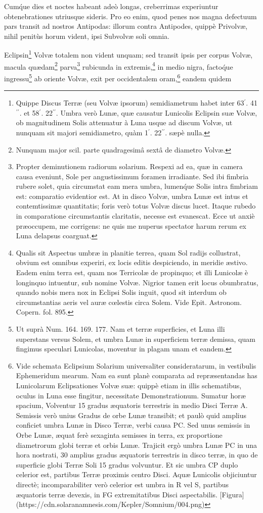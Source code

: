 \documentclass[a4paper, 11pt, oneside, polutonikogreek, german]{article}
\begin{document}
Cum\'que dies et noctes habeant adeò longas, creberrimas experiuntur obtenebrationes utriusque sideris. Pro eo enim, quod penes nos magna defectuum pars transit ad nostros Antipodas: illorum contra Antipodes, quippè Privolvæ, nihil penitùs horum vident, ipsi Subvolvæ soli omnia.

Eclipsin\footnote{Quippe Discus Terræ (seu Volvæ ipsorum) semidiametrum habet inter 63$^{\prime}$. 41$^{\prime\prime}$. et 58$^{\prime}$. 22$^{\prime\prime}$. Umbra verò Lunæ, quæ causatur Lunicolis Eclipsin suæ Volvæ, ob magnitudinem Solis attenuatur à Luna usque ad discum Volvæ, ut nunquam sit majori semidiametro, quàm 1$^{\prime}$. 22$^{\prime\prime}$. sæpè nulla.} Volvæ totalem non vident unquam; sed transit ipsis per corpus Volvæ, macula quædam\footnote{Nunquam major scil. parte quadragesimâ sextâ de diametro Volvæ.} parva\footnote{Propter deminutionem radiorum solarium. Respexi ad ea, quæ in camera causa eveniunt, Sole per angustissimum foramen irradiante. Sed ibi fimbria rubere solet, quia circumstat eam mera umbra, lumen\'que Solis intra fimbriam est: comparatio evidentior est. At in disco Volvæ, umbra Lunæ est intus et contemtissimæ quantitatis; foris verò totus Volvæ discus lucet. Itaque rubedo in comparatione circumstantis claritatis, necesse est evanescat. Ecce ut anxiè præoccupem, me corrigens: ne quis me nuperus spectator harum rerum ex Luna delapsus coarguat.} rubicunda in extremis,\footnote{Qualis sit Aspectus umbræ in planitie terrea, quam Sol radijs collustrat, obvium est omnibus experiri, ex locis editis despiciendo, in meridie æstivo. Eadem enim terra est, quam nos Terricolæ de propinquo; et illi Lunicolæ è longinquo intuentur, sub nomine Volvæ. Nigrior tamen erit locus obumbratus, quando nobis mera nox in Eclipsi Solis inguit, quod sit interdum ob circumstantias aeris vel auræ cœlestis circa Solem. Vide Epit. Astronom. Copern. fol. 895.} in medio nigra, facto\'que ingressu\footnote{Ut suprà Num. 164. 169. 177. Nam et terræ superficies, et Luna illi superstans versus Solem, et umbra Lunæ in superficiem terræ demissa, quam fingimus speculari Lunicolas, moventur in plagam unam et eandem.} ab oriente Volvæ, exit per occidentalem oram,\footnote{Vide schemata Eclipsium Solarium universaliter consideratarum, in vestibulis Ephemeridum mearum. Nam ea sunt planè comparata ad repræsentandas has Lunicolarum Eclipsationes Volvæ suæ: quippè etiam in illis schematibus, oculus in Luna esse fingitur, necessitate Demonstrationum. Sumatur horæ spacium, Volventur 15 gradus æquatoris terrestris in medio Disci Terræ A. Semissis verò unius Gradus de orbe Lunæ transibit; et paulò quid amplius conficiet umbra Lunæ in Disco Terræ, verbi causa PC. Sed unus semissis in Orbe Lunæ, æquat ferè sexaginta semisses in terra, ex proportione diametrorum globi terræ et orbis Lunæ. Trajicit ergò umbra Lunæ PC in una hora nostrati, 30 amplius gradus æquatoris terrestris in disco terræ, in quo de superficie globi Terræ Soli 15 gradus volvuntur. Et sic umbra CP duplo celerior est, partibus Terræ proximis centro Disci. Aquæ Lunicolis objiciuntur directè; incomparabiliter verò celerior est umbra in R vel S, partibus æquatoris terræ devexis, in FG extremitatibus Disci aspectabilis. [Figura](https://cdn.solaranamnesis.com/Kepler/Somnium/004.png)} eandem quidem 
\end{document}
